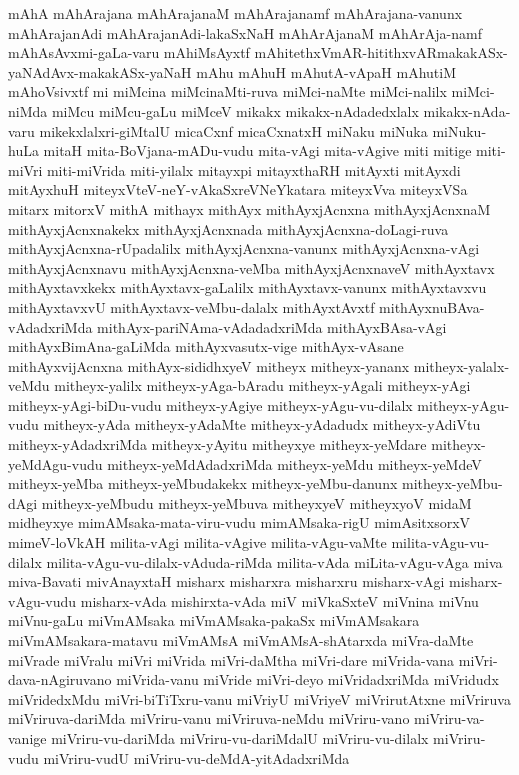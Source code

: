 {mAhA
mAhArajana
mAhArajanaM
mAhArajanamf
mAhArajana-vanunx
mAhArajanAdi
mAhArajanAdi-lakaSxNaH
mAhArAjanaM
mAhArAja-namf
mAhAsAvxmi-gaLa-varu
mAhiMsAyxtf
mAhitethxVmAR-hitithxvARmakakASx-yaNAdAvx-makakASx-yaNaH
mAhu
mAhuH
mAhutA-vApaH
mAhutiM
mAhoVsivxtf
mi
miMcina
miMcinaMti-ruva
miMci-naMte
miMci-nalilx
miMci-niMda
miMcu
miMcu-gaLu
miMceV
mikakx
mikakx-nAdadedxlalx
mikakx-nAda-varu
mikekxlalxri-giMtalU
micaCxnf
micaCxnatxH
miNaku
miNuka
miNuku-huLa
mitaH
mita-BoVjana-mADu-vudu
mita-vAgi
mita-vAgive
miti
mitige
miti-miVri
miti-miVrida
miti-yilalx
mitayxpi
mitayxthaRH
mitAyxti
mitAyxdi
mitAyxhuH
miteyxVteV-neY-vAkaSxreVNeYkatara
miteyxVva
miteyxVSa
mitarx
mitorxV
mithA
mithayx
mithAyx
mithAyxjAcnxna
mithAyxjAcnxnaM
mithAyxjAcnxnakekx
mithAyxjAcnxnada
mithAyxjAcnxna-doLagi-ruva
mithAyxjAcnxna-rUpadalilx
mithAyxjAcnxna-vanunx
mithAyxjAcnxna-vAgi
mithAyxjAcnxnavu
mithAyxjAcnxna-veMba
mithAyxjAcnxnaveV
mithAyxtavx
mithAyxtavxkekx
mithAyxtavx-gaLalilx
mithAyxtavx-vanunx
mithAyxtavxvu
mithAyxtavxvU
mithAyxtavx-veMbu-dalalx
mithAyxtAvxtf
mithAyxnuBAva-vAdadxriMda
mithAyx-pariNAma-vAdadadxriMda
mithAyxBAsa-vAgi
mithAyxBimAna-gaLiMda
mithAyxvasutx-vige
mithAyx-vAsane
mithAyxvijAcnxna
mithAyx-sididhxyeV
mitheyx
mitheyx-yananx
mitheyx-yalalx-veMdu
mitheyx-yalilx
mitheyx-yAga-bAradu
mitheyx-yAgali
mitheyx-yAgi
mitheyx-yAgi-biDu-vudu
mitheyx-yAgiye
mitheyx-yAgu-vu-dilalx
mitheyx-yAgu-vudu
mitheyx-yAda
mitheyx-yAdaMte
mitheyx-yAdadudx
mitheyx-yAdiVtu
mitheyx-yAdadxriMda
mitheyx-yAyitu
mitheyxye
mitheyx-yeMdare
mitheyx-yeMdAgu-vudu
mitheyx-yeMdAdadxriMda
mitheyx-yeMdu
mitheyx-yeMdeV
mitheyx-yeMba
mitheyx-yeMbudakekx
mitheyx-yeMbu-danunx
mitheyx-yeMbu-dAgi
mitheyx-yeMbudu
mitheyx-yeMbuva
mitheyxyeV
mitheyxyoV
midaM
midheyxye
mimAMsaka-mata-viru-vudu
mimAMsaka-rigU
mimAsitxsorxV
mimeV-loVkAH
milita-vAgi
milita-vAgive
milita-vAgu-vaMte
milita-vAgu-vu-dilalx
milita-vAgu-vu-dilalx-vAduda-riMda
milita-vAda
miLita-vAgu-vAga
miva
miva-Bavati
mivAnayxtaH
misharx
misharxra
misharxru
misharx-vAgi
misharx-vAgu-vudu
misharx-vAda
mishirxta-vAda
miV
miVkaSxteV
miVnina
miVnu
miVnu-gaLu
miVmAMsaka
miVmAMsaka-pakaSx
miVmAMsakara
miVmAMsakara-matavu
miVmAMsA
miVmAMsA-shAtarxda
miVra-daMte
miVrade
miVralu
miVri
miVrida
miVri-daMtha
miVri-dare
miVrida-vana
miVri-dava-nAgiruvano
miVrida-vanu
miVride
miVri-deyo
miVridadxriMda
miVridudx
miVridedxMdu
miVri-biTiTxru-vanu
miVriyU
miVriyeV
miVrirutAtxne
miVriruva
miVriruva-dariMda
miVriru-vanu
miVriruva-neMdu
miVriru-vano
miVriru-va-vanige
miVriru-vu-dariMda
miVriru-vu-dariMdalU
miVriru-vu-dilalx
miVriru-vudu
miVriru-vudU
miVriru-vu-deMdA-yitAdadxriMda
}
